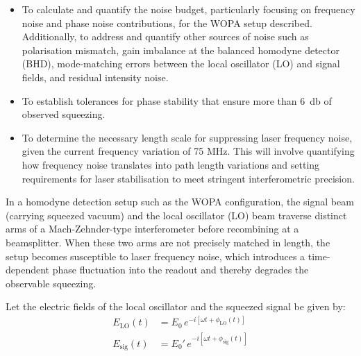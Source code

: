 \documentclass[colorlinks=true,pdfstartview=FitV,linkcolor=blue,
citecolor=red,urlcolor=magenta]{ligodoc}
\begin{document}
\begin{itemize}
    \item To calculate and quantify the noise budget, particularly focusing on frequency noise and phase noise contributions, for the WOPA setup described.  Additionally, to address and quantify other sources of noise such as polarisation mismatch, gain imbalance at the balanced homodyne detector (BHD), mode-matching errors between the local oscillator (LO) and signal fields, and residual intensity noise.
    \item To establish tolerances for phase stability that ensure more than \SI{6}{\decibel} of observed squeezing.
    \item To determine the necessary length scale for suppressing laser frequency noise,  given the current frequency variation of 75 MHz. This will involve quantifying how frequency noise translates into path length variations and setting requirements for laser stabilisation to meet stringent interferometric precision.
\end{itemize}


In a homodyne detection setup such as the WOPA configuration, the signal beam (carrying squeezed vacuum) and the local oscillator (LO) beam traverse distinct arms of a Mach-Zehnder-type interferometer before recombining at a beamsplitter. When these two arms are not precisely matched in length, the setup becomes susceptible to laser frequency noise, which introduces a time-dependent phase fluctuation into the readout and thereby degrades the observable squeezing.

Let the electric fields of the local oscillator and the squeezed signal be given by:
\begin{align}
    E_{\text{LO}}(t) &= E_0 \, e^{-i[\omega t + \phi_{\text{LO}}(t)]} \\
    E_{\text{sig}}(t) &= E_0' \, e^{-i[\omega t + \phi_{\text{sig}}(t)]}
\end{align}
\end{document}
